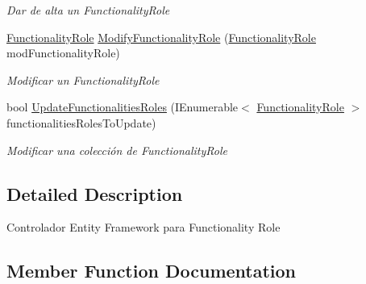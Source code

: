\begin{DoxyCompactItemize}
\begin{DoxyCompactList}\small\item\em Dar de alta un Functionality\+Role \end{DoxyCompactList}\item 
\mbox{\hyperlink{class_h_k_supply_1_1_models_1_1_functionality_role}{Functionality\+Role}} \mbox{\hyperlink{class_h_k_supply_1_1_services_1_1_implementations_1_1_e_f_functionality_role_a69bbb7f8593ea4e0e70ce96625cf80e4}{Modify\+Functionality\+Role}} (\mbox{\hyperlink{class_h_k_supply_1_1_models_1_1_functionality_role}{Functionality\+Role}} mod\+Functionality\+Role)
\begin{DoxyCompactList}\small\item\em Modificar un Functionality\+Role \end{DoxyCompactList}\item 
bool \mbox{\hyperlink{class_h_k_supply_1_1_services_1_1_implementations_1_1_e_f_functionality_role_a298798bba5c1a7e5a1db34803e3e4707}{Update\+Functionalities\+Roles}} (I\+Enumerable$<$ \mbox{\hyperlink{class_h_k_supply_1_1_models_1_1_functionality_role}{Functionality\+Role}} $>$ functionalities\+Roles\+To\+Update)
\begin{DoxyCompactList}\small\item\em Modificar una colección de Functionality\+Role \end{DoxyCompactList}\end{DoxyCompactItemize}


\subsection{Detailed Description}
Controlador Entity Framework para Functionality Role 



\subsection{Member Function Documentation}
\mbox{\label{class_h_k_supply_1_1_services_1_1_implementations_1_1_e_f_functionality_role_a6c0fd4aad39788ef597f701f47032a85}} 
